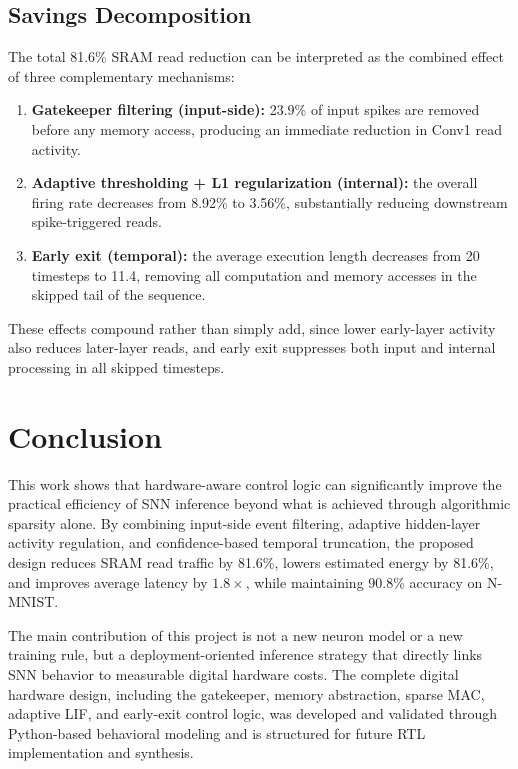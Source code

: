 \documentclass[conference]{IEEEtran}
\begin{document}
\subsection{Savings Decomposition}
The total 81.6\% SRAM read reduction can be interpreted as the combined effect of three complementary mechanisms:
\begin{enumerate}
    \item \textbf{Gatekeeper filtering (input-side):} 23.9\% of input spikes are removed before any memory access, producing an immediate reduction in Conv1 read activity.
    \item \textbf{Adaptive thresholding + L1 regularization (internal):} the overall firing rate decreases from 8.92\% to 3.56\%, substantially reducing downstream spike-triggered reads.
    \item \textbf{Early exit (temporal):} the average execution length decreases from 20 timesteps to 11.4, removing all computation and memory accesses in the skipped tail of the sequence.
\end{enumerate}
These effects compound rather than simply add, since lower early-layer activity also reduces later-layer reads, and early exit suppresses both input and internal processing in all skipped timesteps.

\section{Conclusion}
This work shows that hardware-aware control logic can significantly improve the practical efficiency of SNN inference beyond what is achieved through algorithmic sparsity alone. By combining input-side event filtering, adaptive hidden-layer activity regulation, and confidence-based temporal truncation, the proposed design reduces SRAM read traffic by 81.6\%, lowers estimated energy by 81.6\%, and improves average latency by $1.8\times$, while maintaining 90.8\% accuracy on N-MNIST.

The main contribution of this project is not a new neuron model or a new training rule, but a deployment-oriented inference strategy that directly links SNN behavior to measurable digital hardware costs. The complete digital hardware design, including the gatekeeper, memory abstraction, sparse MAC, adaptive LIF, and early-exit control logic, was developed and validated through Python-based behavioral modeling and is structured for future RTL implementation and synthesis.
\end{document}

